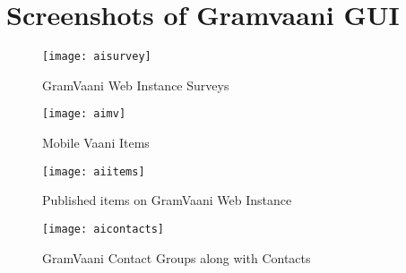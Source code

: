 \chapter{Screenshots of Gramvaani GUI}




\begin{figure}[H]
\begin{center}   
\texttt{[image: aisurvey]}
\caption{GramVaani Web Instance Surveys}
\label{fig:gvinstance1}
\end{center}
\end{figure}



\begin{figure}[H]
\begin{center}   
\texttt{[image: aimv]}
\caption{Mobile Vaani Items}
\label{fig:gvinstance2}
\end{center}
\end{figure}



\begin{figure}[H]
\begin{center}   
\texttt{[image: aiitems]}
\caption{Published items on GramVaani Web Instance}
\label{fig:gvinstance3}
\end{center}
\end{figure}



\begin{figure}[H]
\begin{center}   
\texttt{[image: aicontacts]}
\caption{GramVaani Contact Groups along with Contacts}
\label{fig:gvinstance4}
\end{center}
\end{figure}

